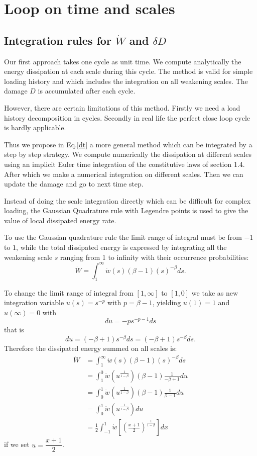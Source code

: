 \documentclass[3p,times,number,review]{elsarticle}
\begin{document}
\section{Loop on time and scales}
\subsection{Integration rules for $\dot{W}$ and $\delta D$}
Our first approach takes one cycle as unit time. We compute analytically the energy dissipation at each scale during this cycle. The method is valid for simple loading history and which includes the integration on all weakening scales. The damage $D$ is accumulated after each cycle.

However, there are certain limitations of this method. Firstly we need a load history decomposition in cycles. Secondly in real life the perfect close loop cycle is hardly applicable.

Thus we propose in Eq.\eqref{dt} a more general method which can be integrated by a step by step strategy. We compute numerically the dissipation at different scales using an implicit Euler time integration of the constitutive laws of section 1.4. After which we make a numerical integration on different scales. Then we can update the damage and go to next time step. 

Instead of doing the scale integration directly which can be difficult for complex loading, the Gaussian Quadrature rule with Legendre points is used to give the value of local dissipated energy rate.

To use the Gaussian quadrature rule the limit range of integral must be from $-1$ to $1$, while the total dissipated energy  is expressed by integrating all the weakening scale $s$ ranging from 1 to infinity with their occurrence probabilities:
$$\dot{W}=\int_{1}^{\infty}\dot{w}(s) (\beta-1)(s)^{-\beta}ds.$$

\noindent
To change the limit range of integral from $[1,\infty]$ to $[1,0]$ we take as new integration variable
$u(s)= s^{-p}$ with $p=\beta-1$, yielding $u(1)=1$ and  $u(\infty)=0$ with
$$du=-ps^{-p-1}ds$$ 
that is
$$du=(-\beta+1) s^{-\beta}ds=(-\beta+1)s^{-\beta} ds.$$
Therefore the dissipated energy summed on all scales is:
\begin{equation}
\begin{split}
\dot{W}&=\int_{1}^{\infty}\dot{w}(s) (\beta-1)(s)^{-\beta}ds
\\&=\int_{1}^{0}\dot{w}\left( u^{\frac{1}{1-\beta}}\right) (\beta-1) \frac{1}{-\beta+1}du
\\&=\int_{0}^{1}\dot{w}\left( u^{\frac{1}{1-\beta}}\right) (\beta-1) \frac{1}{\beta-1}du
\\&=\int_{0}^{1}\dot{w}\left( u^{\frac{1}{1-\beta}}\right)du
\\&=\frac{1}{2}\int_{-1}^{1}\dot{w}\left[  \left( \frac{x+1}{2}\right) ^{\frac{1}{1-\beta}}\right] dx
\end{split}
\label{allscale}
\end{equation}
if we set $u=\dfrac{x+1}{2}$.
\end{document}

